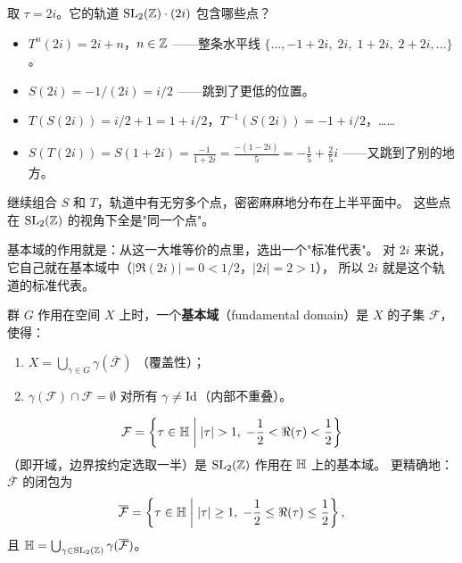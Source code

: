 \begin{example}[轨道是什么样的]
\label{ex:orbit-of-2i}
取 $\tau = 2i$。它的轨道 $\mathrm{SL}_2(\mathbb{Z}) \cdot (2i)$ 包含哪些点？
\begin{itemize}
  \item $T^n(2i) = 2i + n$，$n \in \mathbb{Z}$
    ——整条水平线 $\{\ldots, -1+2i, \; 2i, \; 1+2i, \; 2+2i, \ldots\}$。
  \item $S(2i) = -1/(2i) = i/2$
    ——跳到了更低的位置。
  \item $T(S(2i)) = i/2 + 1 = 1 + i/2$，$T^{-1}(S(2i)) = -1 + i/2$，……
  \item $S(T(2i)) = S(1+2i) = \frac{-1}{1+2i} = \frac{-(1-2i)}{5}
    = -\frac{1}{5} + \frac{2}{5}i$
    ——又跳到了别的地方。
\end{itemize}
继续组合 $S$ 和 $T$，轨道中有无穷多个点，密密麻麻地分布在上半平面中。
这些点在 $\SL_2(\Z)$ 的视角下全是"同一个点"。

基本域的作用就是：从这一大堆等价的点里，选出一个"标准代表"。
对 $2i$ 来说，它自己就在基本域中（$|\Re(2i)| = 0 < 1/2$，$|2i| = 2 > 1$），
所以 $2i$ 就是这个轨道的标准代表。
\end{example}

\begin{definition}[基本域]
\label{def:fundamental-domain}
群 $G$ 作用在空间 $X$ 上时，一个\textbf{基本域}（fundamental domain）是
$X$ 的子集 $\mathcal{F}$，使得：
\begin{enumerate}
  \item $X = \bigcup_{\gamma \in G} \gamma(\overline{\mathcal{F}})$
    （覆盖性）；
  \item $\gamma(\mathcal{F}) \cap \mathcal{F} = \emptyset$ 对所有
    $\gamma \neq \mathrm{Id}$（内部不重叠）。
\end{enumerate}
\end{definition}

\begin{theorem}[$\SL_2(\Z)$ 的标准基本域]
\label{thm:fundamental-domain}
\[
  \mathcal{F} = \left\{\tau \in \mathbb{H} \;\middle|\;
    |\tau| > 1,\; -\frac{1}{2} < \Re(\tau) < \frac{1}{2}
  \right\}
\]
（即开域，边界按约定选取一半）是 $\SL_2(\Z)$ 作用在 $\mathbb{H}$ 上的基本域。
更精确地：$\overline{\mathcal{F}}$ 的闭包为
\[
  \overline{\mathcal{F}} = \left\{\tau \in \mathbb{H} \;\middle|\;
    |\tau| \geq 1,\; -\frac{1}{2} \leq \Re(\tau) \leq \frac{1}{2}
  \right\},
\]
且 $\mathbb{H} = \bigcup_{\gamma \in \mathrm{SL}_2(\mathbb{Z})} \gamma(\overline{\mathcal{F}})$。
\end{theorem}

